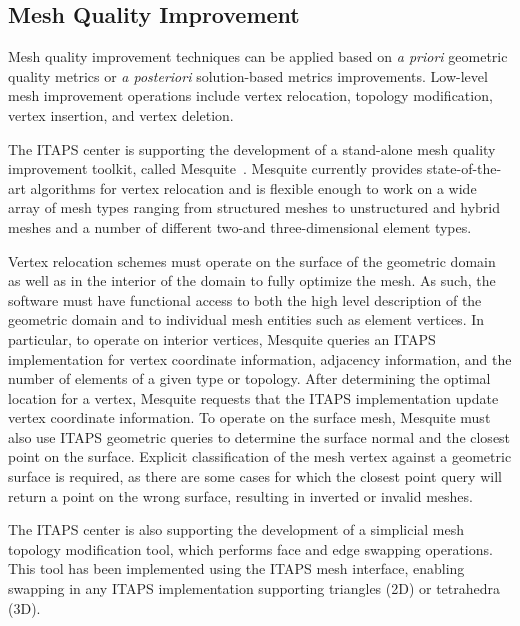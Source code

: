 \subsection{Mesh Quality Improvement}\label{sec:quality-improvement}

Mesh quality improvement techniques can be applied based on {\it a
priori} geometric quality metrics or {\it a posteriori} solution-based
metrics improvements.  Low-level mesh improvement operations include
vertex relocation, topology modification, vertex insertion, and vertex
deletion.   

The ITAPS center is supporting the development of a stand-alone mesh
quality improvement toolkit, called Mesquite~\cite{Mesquite03}.
Mesquite currently provides state-of-the-art algorithms for vertex
relocation and is flexible enough to work on a
wide array of mesh types ranging from structured meshes to unstructured
and hybrid meshes and a number of different two-and three-dimensional
element types.


Vertex relocation schemes must operate on the surface of the geometric
domain as well as in the interior of the domain to fully optimize the
mesh.  As such, the software must have functional access to both the
high level description of the geometric domain and to individual mesh
entities such as element vertices.  In particular, to operate on
interior vertices, Mesquite queries an ITAPS implementation for vertex
coordinate information, adjacency information, and the number of
elements of a given type or topology.  After determining the optimal
location for a vertex, Mesquite requests that the ITAPS implementation
update vertex coordinate information.  To operate on the surface mesh,
Mesquite must also use ITAPS geometric queries to determine the surface
normal and the closest point on the surface.  Explicit classification
of the mesh vertex against a geometric surface is required, as there
are some cases for which the closest point query will return a point
on the wrong surface, resulting in inverted or invalid meshes.

The ITAPS center is also supporting the development of a simplicial mesh
topology modification tool, which performs face and edge swapping
operations.\cite{TSTT-swap-tool}  This tool has been implemented using
the ITAPS mesh interface, enabling swapping in any ITAPS implementation
supporting triangles (2D) or tetrahedra (3D).

